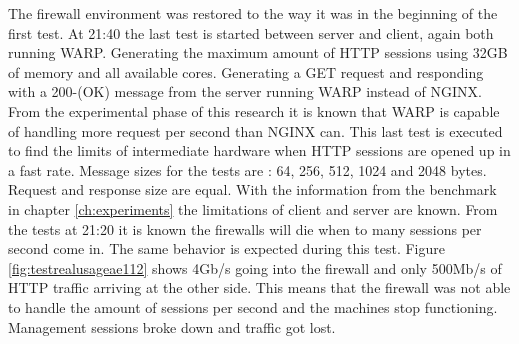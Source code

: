 The firewall environment was restored to the way it was in the beginning of the first test.
At 21:40 the last test is started between server and client, again both running WARP. Generating the maximum amount of HTTP sessions using 32GB of memory and all available cores.
Generating a GET request and responding with a 200-(OK) message from the server running WARP instead of NGINX.  
From the experimental phase of this research it is known that WARP is capable of handling more request per second than NGINX can. This last test is executed to find the limits of intermediate hardware when HTTP sessions are opened up in a fast rate.
Message sizes for the tests are : 64, 256, 512, 1024 and 2048 bytes. Request and response size are equal. 
With the information from the benchmark in chapter \ref{ch:experiments} the limitations of client and server are known. 
From the tests at 21:20 it is known the firewalls will die when to many sessions per second come in. The same behavior is expected during this test.
Figure \ref{fig:testrealusageae112} shows 4Gb/s going into the firewall and only 500Mb/s of HTTP traffic arriving at the other side.
This means that the firewall was not able to handle the amount of sessions per second and the machines stop functioning. 
Management sessions broke down and traffic got lost.


